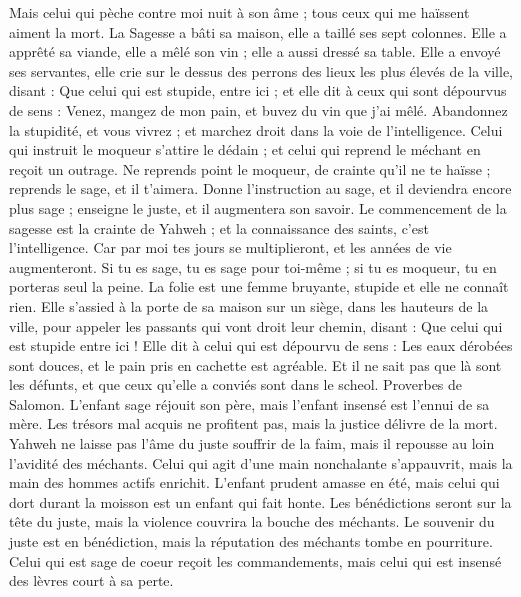 \begin{multicols}{2}
Mais celui qui pèche contre moi nuit à son âme ; tous ceux qui me haïssent aiment la mort.
\VerseOne{}La Sagesse a bâti sa maison, elle a taillé ses sept colonnes.
Elle a apprêté sa viande, elle a mêlé son vin ; elle a aussi dressé sa table.
Elle a envoyé ses servantes, elle crie sur le dessus des perrons des lieux les plus élevés de la ville, disant :
Que celui qui est stupide, entre ici ; et elle dit à ceux qui sont dépourvus de sens :
Venez, mangez de mon pain, et buvez du vin que j'ai mêlé.
Abandonnez la stupidité, et vous vivrez ; et marchez droit dans la voie de l’intelligence.
Celui qui instruit le moqueur s’attire le dédain ; et celui qui reprend le méchant en reçoit un outrage.
Ne reprends point le moqueur, de crainte qu'il ne te haïsse ; reprends le sage, et il t'aimera.
Donne l’instruction au sage, et il deviendra encore plus sage ; enseigne le juste, et il augmentera son savoir.
Le commencement de la sagesse est la crainte de Yahweh ; et la connaissance des saints, c'est l’intelligence.
Car par moi tes jours se multiplieront, et les années de vie augmenteront.
Si tu es sage, tu es sage pour toi-même ; si tu es moqueur, tu en porteras seul la peine.
La folie est une femme bruyante, stupide et elle ne connaît rien.
Elle s'assied à la porte de sa maison sur un siège, dans les hauteurs de la ville,
pour appeler les passants qui vont droit leur chemin, disant :
Que celui qui est stupide entre ici ! Elle dit à celui qui est dépourvu de sens :
Les eaux dérobées sont douces, et le pain pris en cachette est agréable.
Et il ne sait pas que là sont les défunts, et que ceux qu'elle a conviés sont dans le scheol.
\VerseOne{}Proverbes de Salomon. L'enfant sage réjouit son père, mais l'enfant insensé est l'ennui de sa mère.
Les trésors mal acquis ne profitent pas, mais la justice délivre de la mort.
Yahweh ne laisse pas l'âme du juste souffrir de la faim, mais il repousse au loin l’avidité des méchants.
Celui qui agit d’une main nonchalante s’appauvrit, mais la main des hommes actifs enrichit.
L'enfant prudent amasse en été, mais celui qui dort durant la moisson est un enfant qui fait honte.
Les bénédictions seront sur la tête du juste, mais la violence couvrira la bouche des méchants.
Le souvenir du juste est en bénédiction, mais la réputation des méchants tombe en pourriture.
Celui qui est sage de coeur reçoit les commandements, mais celui qui est insensé des lèvres court à sa perte.

\end{multicols}
